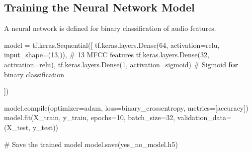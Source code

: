 \documentclass[
  9pt,
  letterpaper,
  abstract,
  titlepage]{scrbook}
\newenvironment{Shaded}{\begin{snugshade}}{\end{snugshade}}
\newcommand{\CharTok}[1]{\textcolor[rgb]{0.13,0.47,0.30}{#1}}
\newcommand{\ControlFlowTok}[1]{\textcolor[rgb]{0.00,0.23,0.31}{\textbf{#1}}}
\newcommand{\DecValTok}[1]{\textcolor[rgb]{0.68,0.00,0.00}{#1}}
\newcommand{\ErrorTok}[1]{\textcolor[rgb]{0.68,0.00,0.00}{#1}}
\newcommand{\NormalTok}[1]{\textcolor[rgb]{0.00,0.23,0.31}{#1}}
\newcommand{\OperatorTok}[1]{\textcolor[rgb]{0.37,0.37,0.37}{#1}}
\newcommand{\PreprocessorTok}[1]{\textcolor[rgb]{0.68,0.00,0.00}{#1}}
\begin{document}
\subsection{Training the Neural Network
Model}\label{training-the-neural-network-model}

A neural network is defined for binary classification of audio features.

\begin{Shaded}
\begin{Highlighting}[]
\NormalTok{model }\OperatorTok{=}\NormalTok{ tf}\OperatorTok{.}\NormalTok{keras}\OperatorTok{.}\NormalTok{Sequential}\OperatorTok{([}
\NormalTok{    tf}\OperatorTok{.}\NormalTok{keras}\OperatorTok{.}\NormalTok{layers}\OperatorTok{.}\NormalTok{Dense}\OperatorTok{(}\DecValTok{64}\OperatorTok{,}\NormalTok{ activation}\OperatorTok{=}\CharTok{\textquotesingle{}r}\ErrorTok{elu}\CharTok{\textquotesingle{}}\OperatorTok{,}\NormalTok{ input\_shape}\OperatorTok{=(}\DecValTok{13}\OperatorTok{,)),}\NormalTok{  \# }\DecValTok{13}\NormalTok{ MFCC features}
\NormalTok{    tf}\OperatorTok{.}\NormalTok{keras}\OperatorTok{.}\NormalTok{layers}\OperatorTok{.}\NormalTok{Dense}\OperatorTok{(}\DecValTok{32}\OperatorTok{,}\NormalTok{ activation}\OperatorTok{=}\CharTok{\textquotesingle{}r}\ErrorTok{elu}\CharTok{\textquotesingle{}}\OperatorTok{),}
\NormalTok{    tf}\OperatorTok{.}\NormalTok{keras}\OperatorTok{.}\NormalTok{layers}\OperatorTok{.}\NormalTok{Dense}\OperatorTok{(}\DecValTok{1}\OperatorTok{,}\NormalTok{ activation}\OperatorTok{=}\CharTok{\textquotesingle{}s}\ErrorTok{igmoid}\CharTok{\textquotesingle{}}\OperatorTok{)}\NormalTok{  \# Sigmoid }\ControlFlowTok{for}\NormalTok{ binary classification}

\OperatorTok{])}

\NormalTok{model}\OperatorTok{.}\NormalTok{compile}\OperatorTok{(}\NormalTok{optimizer}\OperatorTok{=}\CharTok{\textquotesingle{}a}\ErrorTok{dam}\CharTok{\textquotesingle{}}\OperatorTok{,}\NormalTok{ loss}\OperatorTok{=}\CharTok{\textquotesingle{}b}\ErrorTok{inary\_crossentropy}\CharTok{\textquotesingle{}}\OperatorTok{,}\NormalTok{ metrics}\OperatorTok{=[}\CharTok{\textquotesingle{}a}\ErrorTok{ccuracy}\CharTok{\textquotesingle{}}\OperatorTok{])}
\NormalTok{model}\OperatorTok{.}\NormalTok{fit}\OperatorTok{(}\NormalTok{X\_train}\OperatorTok{,}\NormalTok{ y\_train}\OperatorTok{,}\NormalTok{ epochs}\OperatorTok{=}\DecValTok{10}\OperatorTok{,}\NormalTok{ batch\_size}\OperatorTok{=}\DecValTok{32}\OperatorTok{,}\NormalTok{ validation\_data}\OperatorTok{=(}\NormalTok{X\_test}\OperatorTok{,}\NormalTok{ y\_test}\OperatorTok{))}

\PreprocessorTok{\# }\ErrorTok{Save the trained model}
\NormalTok{model}\OperatorTok{.}\NormalTok{save}\OperatorTok{(}\CharTok{\textquotesingle{}y}\ErrorTok{es\_no\_model.h5}\CharTok{\textquotesingle{}}\OperatorTok{)}
\end{Highlighting}
\end{Shaded}
\end{document}
